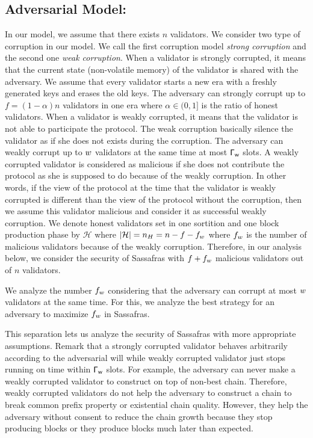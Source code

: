 \subsection{Adversarial Model:} 
In our model, we assume that there exists $ n $ validators.  We consider two type of corruption in our model. We call the first corruption model \emph{strong corruption} and the second one \emph{weak corruption}. When a validator is strongly corrupted, it means that the current state (non-volatile memory) of the validator is shared with the adversary. We assume that every validator starts a new era with a freshly generated keys and erases the old keys. The adversary can strongly corrupt up to $ f = (1-\alpha)n $ validators in one era where $ \alpha \in (0,1] $ is the ratio of honest validators.  
When a validator is weakly corrupted, it means that the validator is not able to participate the protocol. The weak corruption basically silence the validator as if she does not exists during the corruption. The adversary can weakly corrupt up to $ w $ validators at the same time at most  $ \mathsf{\Gamma_{w}} $ slots. A weakly corrupted validator is considered as malicious if she does not contribute the protocol as she is supposed to do because of the weakly corruption.  In other words, if the view of the protocol at the time that the validator is weakly corrupted is different than the view of the protocol without the corruption, then we assume this validator malicious and consider it as successful weakly corruption.  We denote honest validators set in one sortition and one block production phase by $ \mathcal{H} $ where $ |\mathcal{H}| = n_H = n-f - f_{w}$ where $ f_{w} $ is the number of malicious validators because of the weakly corruption.  Therefore, in our analysis below, we consider the security of Sassafras with $ f + f_{w}$ malicious validators out of $ n $ validators. 

We analyze the number $ f_{w} $ considering that the adversary can corrupt at most $ w $ validators at the same time. For this, we analyze the best strategy for an adversary to maximize $ f_{w} $ in Sassafras.



This separation lets us analyze the security of Sassafras with more appropriate assumptions. Remark that a strongly corrupted validator behaves arbitrarily according to the adversarial will while weakly corrupted validator just stops running on time within $ \mathsf{\Gamma_{w}} $ slots. For example, the adversary can never make a weakly corrupted validator to construct on top of non-best chain. Therefore, weakly corrupted validators do not help  the adversary to construct a chain to break common prefix property or existential chain quality.  However, they help the adversary without consent to reduce the chain growth because they stop producing blocks or they produce blocks much later than expected.





